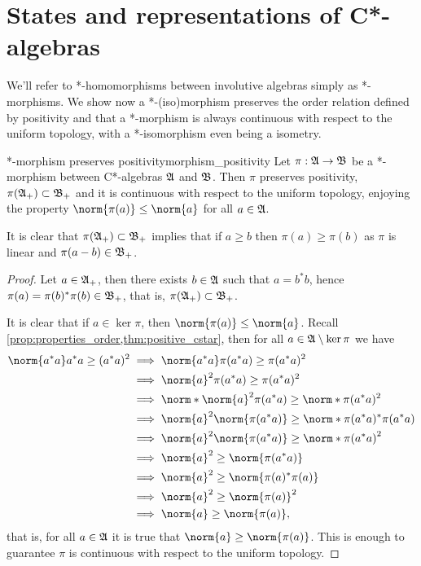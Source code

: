 \section{States and representations of C*-algebras}
We'll refer to *-homomorphisms between involutive algebras simply as *-morphisms. We show now a *-(iso)morphism preserves the order relation defined by positivity and that a *-morphism is always continuous with respect to the uniform topology, with a *-isomorphism even being a isometry.
\begin{proposition}{*-morphism preserves positivity}{morphism_positivity}
    Let \(\pi : \mathfrak{A} \to \mathfrak{B}\) be a *-morphism between C*-algebras \(\mathfrak{A}\) and \(\mathfrak{B}\). Then \(\pi\) preserves positivity, \(\pi(\mathfrak{A}_+)\subset \mathfrak{B}_+\) and it is continuous with respect to the uniform topology, enjoying the property \(\norm{\pi(a)} \leq \norm{a}\) for all \(a \in \mathfrak{A}\).
\end{proposition}
\begin{remark}
    It is clear that \(\pi(\mathfrak{A}_+) \subset \mathfrak{B}_+\) implies that if \(a \geq b\) then \(\pi(a) \geq \pi(b)\) as \(\pi\) is linear and \(\pi(a-b) \in \mathfrak{B}_+\).
\end{remark}
\begin{proof}
    Let \(a \in \mathfrak{A}_+\), then there exists \(b \in \mathfrak{A}\) such that \(a = b^*b\), hence \(\pi(a) = \pi(b)^* \pi(b) \in \mathfrak{B}_+\), that is, \(\pi(\mathfrak{A}_+)\subset \mathfrak{B}_+\).

    It is clear that if \(a \in \ker\pi\), then \(\norm{\pi(a)} \leq \norm{a}\). Recall \cref{prop:properties_order,thm:positive_cstar}, then for all \(a \in \mathfrak{A}\setminus\ker{\pi}\) we have
    \begin{align*}
        \norm{a^*a} a^*a \geq (a^*a)^2 &\implies \norm{a^*a} \pi(a^*a) \geq \pi(a^*a)^2\\
                                       &\implies \norm{a}^2 \pi(a^*a) \geq \pi(a^*a)^2\\
                                       &\implies \norm*{\norm{a}^2 \pi(a^*a)} \geq \norm*{\pi(a^*a)^2}\\
                                       &\implies \norm{a}^2 \norm{\pi(a^*a)} \geq \norm*{\pi(a^*a)^* \pi(a^*a)}\\
                                       &\implies \norm{a}^2 \norm{\pi(a^*a)} \geq \norm*{\pi(a^*a)}^2\\
                                       &\implies \norm{a}^2 \geq \norm{\pi(a^*a)}\\
                                       &\implies \norm{a}^2 \geq \norm{\pi(a)^* \pi(a)}\\
                                       &\implies \norm{a}^2 \geq \norm{\pi(a)}^2\\
                                       &\implies \norm{a} \geq \norm{\pi(a)},
    \end{align*}
    that is, for all \(a \in \mathfrak{A}\) it is true that \(\norm{a} \geq \norm{\pi(a)}\). This is enough to guarantee \(\pi\) is continuous with respect to the uniform topology.
\end{proof}
